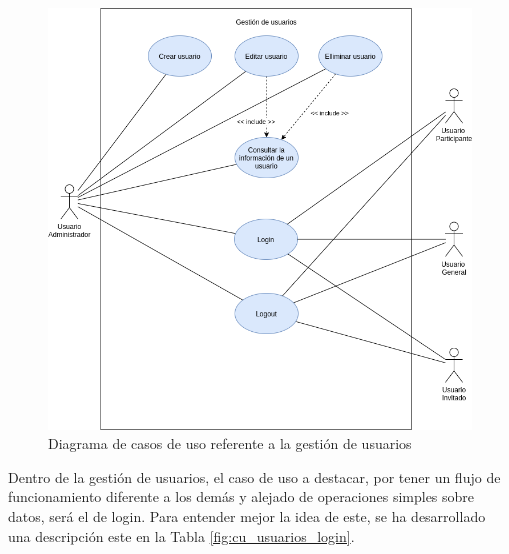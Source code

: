 \begin{figure}[hp!]
    \centering
    \includegraphics[width=1\linewidth]{diseno/sistema/CU/usuarios.png}
    \caption{Diagrama de casos de uso referente a la gestión de usuarios}
    \label{fig:cu_usuarios}
\end{figure}

Dentro de la gestión de usuarios, el caso de uso a destacar, por tener un flujo de funcionamiento diferente a los demás y alejado de operaciones simples sobre datos, será el de login. Para entender mejor la idea de este, se ha desarrollado una descripción este en la Tabla \ref{fig:cu_usuarios_login}.

